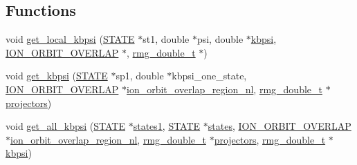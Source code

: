 \subsection*{Functions}
\begin{DoxyCompactItemize}
\item 
void \hyperlink{_o_n_2_o_n-_n_e_g_f-share_2get__all__kbpsi_8c_af025d41ea1fe109bcce4fccbf366ec0d}{get\-\_\-local\-\_\-kbpsi} (\hyperlink{struct_s_t_a_t_e}{S\-T\-A\-T\-E} $\ast$st1, double $\ast$psi, double $\ast$\hyperlink{overlap_8h_aa5c5ccb14e2d6e1303536c0d5b8f10e6}{kbpsi}, \hyperlink{struct_i_o_n___o_r_b_i_t___o_v_e_r_l_a_p}{I\-O\-N\-\_\-\-O\-R\-B\-I\-T\-\_\-\-O\-V\-E\-R\-L\-A\-P} $\ast$, \hyperlink{rmgtypes_8h_aaa16921c14f121c56eaa42390a340db8}{rmg\-\_\-double\-\_\-t} $\ast$)
\item 
void \hyperlink{_o_n_2_o_n-_n_e_g_f-share_2get__all__kbpsi_8c_a29a1077c29b6e049e59207473bee743e}{get\-\_\-kbpsi} (\hyperlink{struct_s_t_a_t_e}{S\-T\-A\-T\-E} $\ast$sp1, double $\ast$kbpsi\-\_\-one\-\_\-state, \hyperlink{struct_i_o_n___o_r_b_i_t___o_v_e_r_l_a_p}{I\-O\-N\-\_\-\-O\-R\-B\-I\-T\-\_\-\-O\-V\-E\-R\-L\-A\-P} $\ast$\hyperlink{overlap_8h_a3f6f41aad9960000a7629ce965eba61d}{ion\-\_\-orbit\-\_\-overlap\-\_\-region\-\_\-nl}, \hyperlink{rmgtypes_8h_aaa16921c14f121c56eaa42390a340db8}{rmg\-\_\-double\-\_\-t} $\ast$\hyperlink{md_8h_a108009ce985b03b7d7c27687de3a5674}{projectors})
\item 
void \hyperlink{_o_n_2_o_n-_n_e_g_f-share_2get__all__kbpsi_8c_a568c8c700aaffdc3a34a61d622a964f6}{get\-\_\-all\-\_\-kbpsi} (\hyperlink{struct_s_t_a_t_e}{S\-T\-A\-T\-E} $\ast$\hyperlink{md_8h_a10867c0650687df1688d9455980e10a9}{states1}, \hyperlink{struct_s_t_a_t_e}{S\-T\-A\-T\-E} $\ast$\hyperlink{md_8h_a286ebf6b996d2b1827eb9a889dfc83d7}{states}, \hyperlink{struct_i_o_n___o_r_b_i_t___o_v_e_r_l_a_p}{I\-O\-N\-\_\-\-O\-R\-B\-I\-T\-\_\-\-O\-V\-E\-R\-L\-A\-P} $\ast$\hyperlink{overlap_8h_a3f6f41aad9960000a7629ce965eba61d}{ion\-\_\-orbit\-\_\-overlap\-\_\-region\-\_\-nl}, \hyperlink{rmgtypes_8h_aaa16921c14f121c56eaa42390a340db8}{rmg\-\_\-double\-\_\-t} $\ast$\hyperlink{md_8h_a108009ce985b03b7d7c27687de3a5674}{projectors}, \hyperlink{rmgtypes_8h_aaa16921c14f121c56eaa42390a340db8}{rmg\-\_\-double\-\_\-t} $\ast$\hyperlink{overlap_8h_aa5c5ccb14e2d6e1303536c0d5b8f10e6}{kbpsi})
\end{DoxyCompactItemize}



